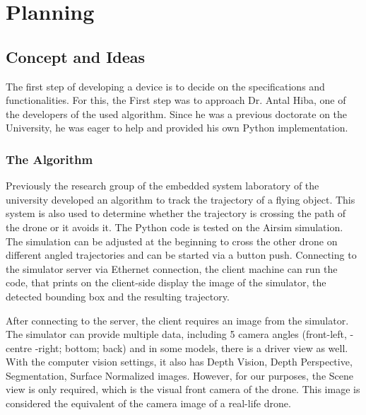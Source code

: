 \chapter{Planning} \label{ch:plan} %

\section{Concept and Ideas} %
The first step of developing a device is to decide on the specifications and functionalities.
For this, the First step was to approach Dr. Antal Hiba, one of the developers of the used algorithm.
Since he was a previous doctorate on the University, he was eager to help and provided his own Python implementation.

\subsection{The Algorithm} %
Previously the research group of the embedded system laboratory of the university developed an algorithm to track the trajectory of a flying object.
This system is also used to determine whether the trajectory is crossing the path of the drone or it avoids it.
The Python code is tested on the Airsim simulation.
The simulation can be adjusted at the beginning to cross the other drone on different angled trajectories and can be started via a button push.
Connecting to the simulator server via Ethernet connection, the client machine can run the code, that prints on the client-side display the image of the simulator, the detected bounding box and the resulting trajectory.

After connecting to the server, the client requires an image from the simulator.
The simulator can provide multiple data, including 5 camera angles (front-left, -centre -right; bottom; back) and in some models, there is a driver view as well.
With the computer vision settings, it also has Depth Vision, Depth Perspective, Segmentation, Surface Normalized images.
However, for our purposes, the Scene view is only required, which is the visual front camera of the drone.
This image is considered the equivalent of the camera image of a real-life drone.

